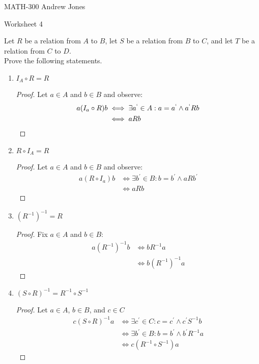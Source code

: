 \documentclass{article}
\begin{document}
    MATH-300 \hfill Andrew Jones
  \begin{center}
  {\huge Worksheet 4}
  \end{center}
  Let $R$ be a relation from $A$ to $B$, let $S$ be a relation from $B$ to $C$, and let $T$ be a relation from $C$ to $D$. \\ Prove the following statements. \\
  \begin{enumerate}
    \item $I_A \circ R = R$
      \begin{proof}
        Let $a\in A$ and $b\in B$ and observe:
        \begin{align*}
          a(I_a \circ R)b &\iff \exists a^`\in A: a = a^` \wedge a^`Rb \\
          &\iff aRb
        \end{align*}
      \end{proof}
    \item $R \circ I_A = R$
      \begin{proof}
        Let $a\in A$ and $b\in B$ and observe:
        \begin{align*}
          a(R \circ I_a)b &\iff \exists b^{'}\in B: b = b^{'} \wedge aRb^{'} \\
          &\iff aRb
        \end{align*}
      \end{proof}
    \item $(R^{-1})^{-1} = R$
      \begin{proof}
        Fix $a\in A$ and $b\in B$:
        \begin{align*}
          a(R^{-1})^{-1}b &\iff bR^{-1}a \\
          &\iff b(R^{-1})^{-1}a
        \end{align*}
      \end{proof}
    \item $(S \circ R)^{-1} = R^{-1}\circ S^{-1}$
      \begin{proof}
        Let $a\in A$, $b\in B$, and $c\in C$
        \begin{align*}
          c(S \circ R)^{-1}a &\iff \exists c^{'}\in C: c = c^{'} \wedge c^{'}S^{-1}b \\
          &\iff \exists b^{'}\in B: b=b^{'} \wedge b^{'}R^{-1}a \\
          &\iff c(R^{-1} \circ S^{-1})a
        \end{align*}

\end{proof}
\end{enumerate}
\end{document}
